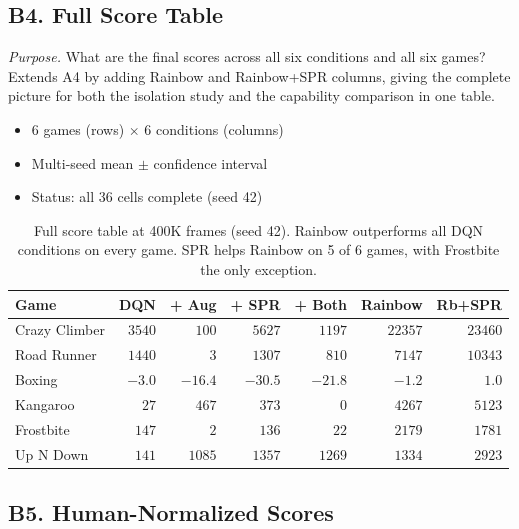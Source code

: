 \documentclass[11pt]{article}
\begin{document}
\subsection*{B4. Full Score Table}

\noindent\textit{Purpose.} What are the final scores across all
six conditions and all six games? Extends A4 by adding Rainbow
and Rainbow+SPR columns, giving the complete picture for both
the isolation study and the capability comparison in one table.

\begin{itemize}[leftmargin=2em, itemsep=0.1em, topsep=0.3em]
  \item 6 games (rows) $\times$ 6 conditions (columns)
  \item Multi-seed mean $\pm$ confidence interval
  \item Status: all 36 cells complete (seed 42)
\end{itemize}

\begin{table}[H]
\centering
\small
\renewcommand{\arraystretch}{1.4}
\begin{tabular}{l r r r r r r}
\toprule
\textbf{Game} & \textbf{DQN} & \textbf{+ Aug}
  & \textbf{+ SPR} & \textbf{+ Both}
  & \textbf{Rainbow} & \textbf{Rb+SPR} \\
\midrule
Crazy Climber & $3540$  & $100$   & $5627$  & $1197$  & $22357$ & $23460$ \\
Road Runner   & $1440$  & $3$     & $1307$  & $810$   & $7147$  & $10343$ \\
Boxing        & $-3.0$  & $-16.4$ & $-30.5$ & $-21.8$ & $-1.2$  & $1.0$   \\
Kangaroo      & $27$    & $467$   & $373$   & $0$     & $4267$  & $5123$  \\
Frostbite     & $147$   & $2$     & $136$   & $22$    & $2179$  & $1781$  \\
Up N Down     & $141$   & $1085$  & $1357$  & $1269$  & $1334$  & $2923$  \\
\bottomrule
\end{tabular}
\caption{Full score table at 400K frames (seed 42). Rainbow
outperforms all DQN conditions on every game. SPR helps Rainbow
on 5 of 6 games, with Frostbite the only exception.}
\end{table}

\subsection*{B5. Human-Normalized Scores}
\end{document}
